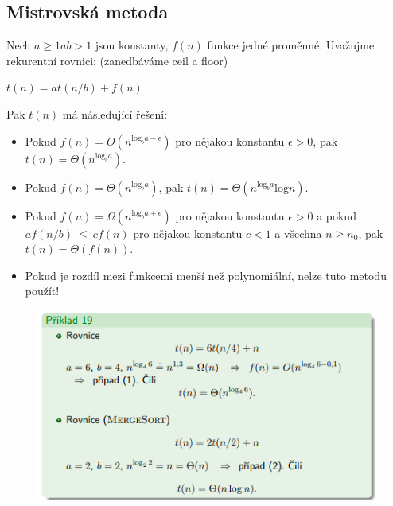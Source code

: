\documentclass{szzclass}
\begin{document}
\subsection{Mistrovská metoda}

Nech $a \geq 1 a b > 1$ jsou konstanty, $f(n)$ funkce jedné proměnné.
Uvažujme rekurentní rovnici: (zanedbáváme ceil a floor)
\begin{center}
    $t(n) = at(n/b) + f(n)$ 
\end{center}

Pak $t(n)$ má následující řešení:
\begin{itemize}
    \item Pokud $f(n) = O(n^{\text{log}_b a - \epsilon} )$ pro nějakou konstantu $\epsilon > 0$, pak $t(n) = \Theta (n^{\text{log}_b a})$.
    \item Pokud $f(n) = \Theta (n^{\text{log}_b a})$, pak $t(n) = \Theta (n^{\text{log}_b a} \text{log} n)$.
    \item Pokud $f(n) = \Omega (n^{\text{log}_b a + \epsilon} )$ pro nějakou konstantu $\epsilon > 0$ a pokud
    $af(n/b)~\leq~cf(n)$ pro nějakou konstantu $c < 1$ a všechna $n \geq n_0$, pak $t(n) = \Theta (f(n))$.
    \item Pokud je rozdíl mezi funkcemi menší než polynomiální, nelze tuto metodu použít!
\end{itemize}



\begin{figure}[h]
    \includegraphics[width=\textwidth, center]{topics/bi-spol-32/images/mt1.PNG}
\end{figure}
\end{document}
